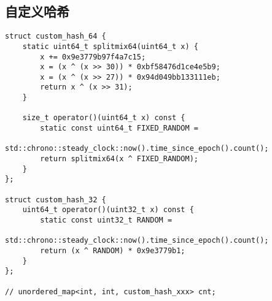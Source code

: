 \subsection{自定义哈希}
\begin{lstlisting}
struct custom_hash_64 {
    static uint64_t splitmix64(uint64_t x) {
        x += 0x9e3779b97f4a7c15;
        x = (x ^ (x >> 30)) * 0xbf58476d1ce4e5b9;
        x = (x ^ (x >> 27)) * 0x94d049bb133111eb;
        return x ^ (x >> 31);
    }

    size_t operator()(uint64_t x) const {
        static const uint64_t FIXED_RANDOM = 
            std::chrono::steady_clock::now().time_since_epoch().count();
        return splitmix64(x ^ FIXED_RANDOM);
    }
};

struct custom_hash_32 {
    uint64_t operator()(uint32_t x) const {
        static const uint32_t RANDOM = 
            std::chrono::steady_clock::now().time_since_epoch().count();
        return (x ^ RANDOM) * 0x9e3779b1;
    }
};

// unordered_map<int, int, custom_hash_xxx> cnt;
\end{lstlisting}
